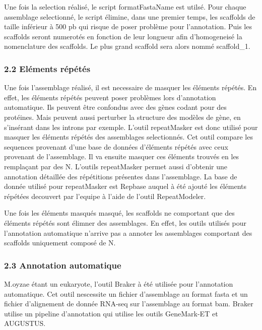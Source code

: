 \documentclass[]{article}
\begin{document}
Une fois la selection réalisé, le script formatFastaName est utilsé.
Pour chaque assemblage selectionné, le script élimine, dans une premier
temps, les scaffolds de taille inférieur à 500 pb qui risque de poser
problème pour l'annotation. Puis les scaffolds seront numerotés en
fonction de leur longueur afin d'homogeneisé la nomenclature des
scaffolds. Le plus grand scaffold sera alors nommé scaffold\_1.

\subsubsection{2.2 Eléments répétés}\label{elements-repetes}

Une fois l'assemblage réalisé, il est necessaire de masquer les éléments
répétés. En effet, les éléments répétés peuvent poser problèmes lors
d'annotation automatique. Ils peuvent être confondus avec des gènes
codant pour des protéines. Mais peuvent aussi perturber la structure des
modèles de gène, en s'insérant dans les introns par exemple. L'outil
repeatMasker est donc utilisé pour masquer les éléments répétés des
assemblages selectionnés. Cet outil compare les sequences provenant
d'une base de données d'éléments répétés avec ceux provenant de
l'assemblage. Il va ensuite masquer ces éléments trouvés en les
remplaçant par des N. L'outils repeatMasker permet aussi d'obtenir une
annotation détaillée des répétitions présentes dans l'assemblage. La
base de donnée utilisé pour repeatMasker est Repbase auquel à été ajouté
les éléments répétées decouvert par l'equipe à l'aide de l'outil
RepeatModeler.

Une fois les éléments masqués masqué, les scaffolds ne comportant que
des éléments répétés sont élimner des assemblages. En effet, les outils
utilisés pour l'annotation automatique n'arrive pas a annoter les
assemblages comportant des scaffolds uniquement composé de N.

\subsubsection{2.3 Annotation automatique}\label{annotation-automatique}

M.oyzae étant un eukaryote, l'outil Braker à été utilisée pour
l'annotation automatique. Cet outil nescessite un fichier d'assemblage
au format fasta et un fichier d'alignement de donnée RNA-seq sur
l'assemblage au format bam. Braker utilise un pipeline d'annotation qui
utilise les outils GeneMark-ET et AUGUSTUS.
\end{document}
